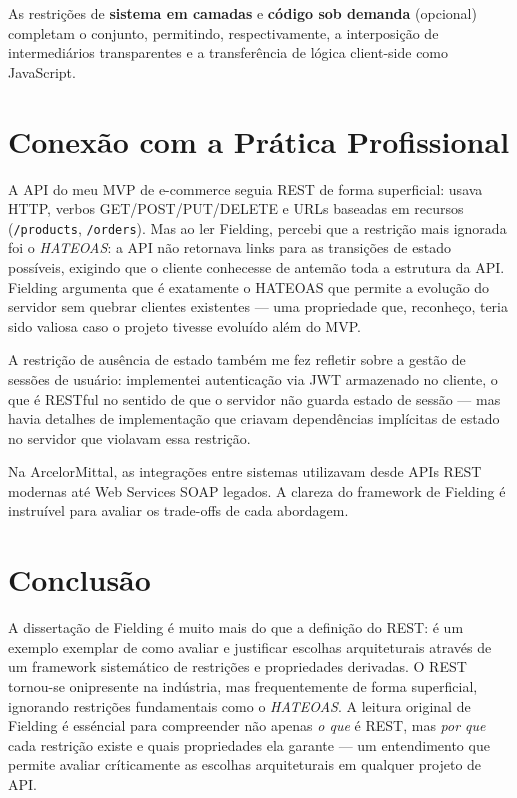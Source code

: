 \documentclass[12pt,a4paper]{article}
\begin{document}
As restri\c{c}\~oes de \textbf{sistema em camadas} e \textbf{c\'odigo sob demanda}
(opcional) completam o conjunto, permitindo, respectivamente, a interposi\c{c}\~ao
de intermediários transparentes e a transfer\^encia de l\'ogica client-side como
JavaScript.

\section{Conex\~ao com a Pr\'atica Profissional}

A API do meu MVP de e-commerce seguia REST de forma superficial: usava HTTP,
verbos GET/POST/PUT/DELETE e URLs baseadas em recursos (\texttt{/products},
\texttt{/orders}). Mas ao ler Fielding, percebi que a restri\c{c}\~ao mais ignorada
foi o \textit{HATEOAS}: a API n\~ao retornava links para as transi\c{c}\~oes de
estado poss\'iveis, exigindo que o cliente conhecesse de antem\~ao toda a estrutura
da API. Fielding argumenta que \'e exatamente o HATEOAS que permite a evolu\c{c}\~ao
do servidor sem quebrar clientes existentes --- uma propriedade que, reconhe\c{c}o,
teria sido valiosa caso o projeto tivesse evolu\'ido al\'em do MVP.

A restri\c{c}\~ao de aus\^encia de estado tamb\'em me fez refletir sobre a
gest\~ao de sess\~oes de usu\'ario: implementei autentica\c{c}\~ao via JWT
armazenado no cliente, o que \'e RESTful no sentido de que o servidor n\~ao guarda
estado de sess\~ao --- mas havia detalhes de implementa\c{c}\~ao que criavam
depend\^encias impl\'icitas de estado no servidor que violavam essa restri\c{c}\~ao.

Na ArcelorMittal, as integra\c{c}\~oes entre sistemas utilizavam desde APIs REST
modernas at\'e Web Services SOAP legados. A clareza do framework de Fielding \'e
instru\'ivel para avaliar os trade-offs de cada abordagem.

\section{Conclus\~ao}

A disserta\c{c}\~ao de Fielding \'e muito mais do que a defini\c{c}\~ao do REST:
\'e um exemplo exemplar de como avaliar e justificar escolhas arquiteturais atrav\'es
de um framework sistem\'atico de restri\c{c}\~oes e propriedades derivadas. O
REST tornou-se onipresente na ind\'ustria, mas frequentemente de forma superficial,
ignorando restri\c{c}\~oes fundamentais como o \textit{HATEOAS}. A leitura original
de Fielding \'e ess\'encial para compreender n\~ao apenas \textit{o que} \'e REST,
mas \textit{por que} cada restri\c{c}\~ao existe e quais propriedades ela garante
--- um entendimento que permite avaliar cr\'iticamente as escolhas arquiteturais
em qualquer projeto de API.
\end{document}
